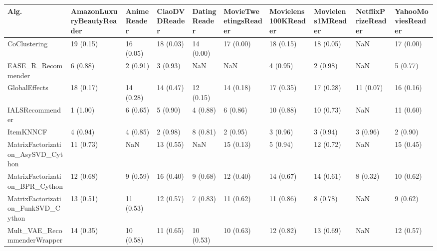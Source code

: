 \begin{tabular}{llllllllll}
\toprule
                               Alg. & AmazonLuxuryBeautyReader & AnimeReader & CiaoDVDReader & DatingReader & MovieTweetingsReader & Movielens100KReader & Movielens1MReader & NetflixPrizeReader & YahooMoviesReader \\
\midrule
                       CoClustering &                19 (0.15) &   16 (0.05) &     18 (0.03) &    14 (0.00) &            17 (0.00) &           18 (0.15) &         18 (0.05) &                NaN &         17 (0.00) \\
                 EASE\_R\_Recommender &                 6 (0.88) &    2 (0.91) &      3 (0.93) &          NaN &                  NaN &            4 (0.95) &          2 (0.98) &                NaN &          5 (0.77) \\
                      GlobalEffects &                18 (0.17) &   14 (0.28) &     14 (0.47) &    12 (0.15) &            14 (0.18) &           17 (0.35) &         17 (0.28) &          11 (0.07) &         16 (0.16) \\
                    IALSRecommender &                 1 (1.00) &    6 (0.65) &      5 (0.90) &     4 (0.88) &             6 (0.86) &           10 (0.88) &         10 (0.73) &                NaN &         11 (0.60) \\
                          ItemKNNCF &                 4 (0.94) &    4 (0.85) &      2 (0.98) &     8 (0.81) &             2 (0.95) &            3 (0.96) &          3 (0.94) &           3 (0.96) &          2 (0.90) \\
  MatrixFactorization\_AsySVD\_Cython &                11 (0.73) &         NaN &     13 (0.55) &          NaN &            15 (0.13) &            5 (0.94) &         12 (0.72) &                NaN &         15 (0.45) \\
     MatrixFactorization\_BPR\_Cython &                12 (0.68) &    9 (0.59) &     16 (0.40) &     9 (0.68) &            12 (0.40) &           14 (0.67) &         14 (0.61) &           8 (0.32) &         10 (0.62) \\
 MatrixFactorization\_FunkSVD\_Cython &                13 (0.51) &   11 (0.53) &     12 (0.57) &     7 (0.83) &            11 (0.62) &           11 (0.86) &          8 (0.78) &                NaN &          9 (0.62) \\
        Mult\_VAE\_RecommenderWrapper &                14 (0.35) &   10 (0.58) &     11 (0.65) &    10 (0.53) &            10 (0.63) &           12 (0.82) &         13 (0.69) &                NaN &         12 (0.57) \\

\end{tabular}
